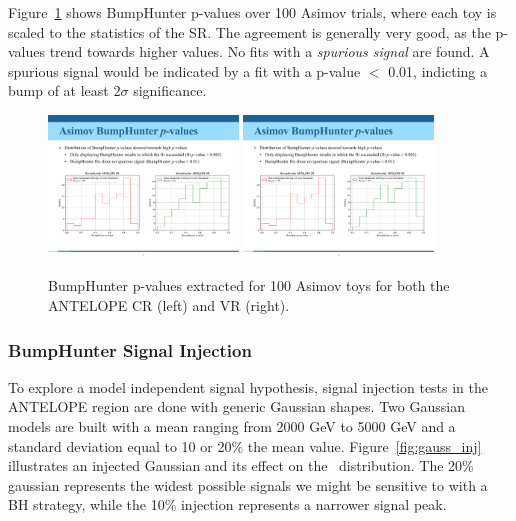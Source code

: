 Figure~\ref{fig:bh_asimov_pvals} shows BumpHunter p-values over 100 Asimov trials, where each toy is scaled to the statistics of the SR.
The agreement is generally very good, as the p-values trend towards higher values.
No fits with a \textit{spurious signal} are found.
A spurious signal would be indicated by a fit with a p-value $<$ 0.01, indicting a bump of at least $2\sigma$ significance.
\begin{figure}[!htbp]
\centering
   \includegraphics[width=0.45\textwidth]{figures/stats/bh_asimov_pvals_cr}
   \includegraphics[width=0.45\textwidth]{figures/stats/bh_asimov_pvals_vr}
    \caption{BumpHunter p-values extracted for 100 Asimov toys for both the ANTELOPE CR (left) and VR (right).
    \label{fig:bh_asimov_pvals}}
\end{figure}

\subsubsection{BumpHunter Signal Injection}
\label{subsec:bhsiginj}

To explore a model independent signal hypothesis, signal injection tests in the ANTELOPE region are done with generic Gaussian shapes.
Two Gaussian models are built with a mean ranging from 2000 GeV to 5000 GeV and a standard deviation equal to 10 or 20\% the mean value.
Figure~\ref{fig:gauss_inj} illustrates an injected Gaussian and its effect on the \mt~distribution.
The 20\% gaussian represents the widest possible signals we might be sensitive to with a BH strategy, while the 10\% injection represents a narrower signal peak. 

